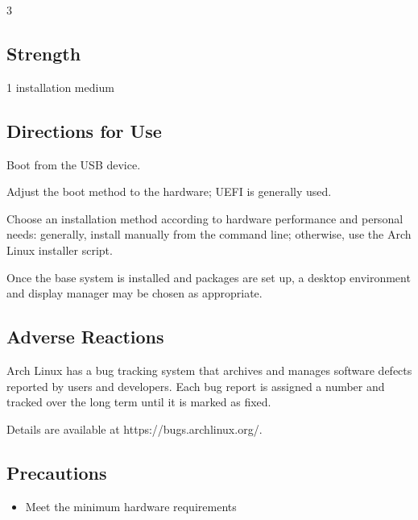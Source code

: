 \documentclass{article}
\begin{document}
\begin{multicols*}{3}
	\begin{tcolorbox}
	\section*{Strength}
	\end{tcolorbox}

	1 installation medium

	\medskip

	\begin{tcolorbox}
	\section*{Directions for Use}
	\end{tcolorbox}

	Boot from the USB device.

	Adjust the boot method to the hardware; UEFI is generally used.

	Choose an installation method according to hardware performance and personal needs: generally, install manually from the command line; otherwise, use the Arch Linux installer script.

	Once the base system is installed and packages are set up, a desktop environment and display manager may be chosen as appropriate.

	\medskip

	\begin{tcolorbox}
	\section*{Adverse Reactions}
	\end{tcolorbox}

	Arch Linux has a bug tracking system that archives and manages software defects reported by users and developers. Each bug report is assigned a number and tracked over the long term until it is marked as fixed.

	Details are available at https://bugs.archlinux.org/.

	\medskip


	\begin{tcolorbox}
	\section*{Precautions}
	\end{tcolorbox}
	\begin{itemize}[leftmargin=*]

		\item Meet the minimum hardware requirements


\end{itemize}
\end{multicols*}
\end{document}
